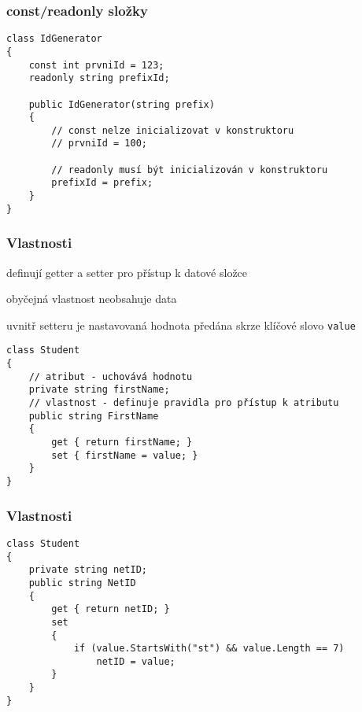 \begin{frame}[fragile]
\frametitle{const/readonly složky}
\vfill
\begin{yesblock}
\begin{lstlisting}
class IdGenerator
{
    const int prvniId = 123;
    readonly string prefixId;

    public IdGenerator(string prefix)
    {
        // const nelze inicializovat v konstruktoru
        // prvniId = 100;

        // readonly musí být inicializován v konstruktoru
        prefixId = prefix;
    }
}
\end{lstlisting}
\end{yesblock}
\vfill
\end{frame}





\begin{frame}[fragile]
\frametitle{Vlastnosti}
\vfill
\begin{bitemize}{}
\item definují getter a setter pro přístup k datové složce
\item obyčejná vlastnost neobsahuje data
\item uvnitř setteru je nastavovaná hodnota předána skrze klíčové slovo \lstinline|value|
\end{bitemize}
\vfill
\begin{yesblock}
\begin{lstlisting}[morekeywords=value]
class Student
{
    // atribut - uchovává hodnotu
    private string firstName; 
    // vlastnost - definuje pravidla pro přístup k atributu
    public string FirstName 
    {
        get { return firstName; }
        set { firstName = value; }
    }
}
\end{lstlisting}
\end{yesblock}
\vfill
\end{frame}



\begin{frame}[fragile]
\frametitle{Vlastnosti}
\begin{yesblock}
\begin{lstlisting}[morekeywords=value]
class Student
{
    private string netID;
    public string NetID
    {
        get { return netID; }
        set
        {
            if (value.StartsWith("st") && value.Length == 7)
                netID = value;
        }
    }
}
\end{lstlisting}
\end{yesblock}
\end{frame}


